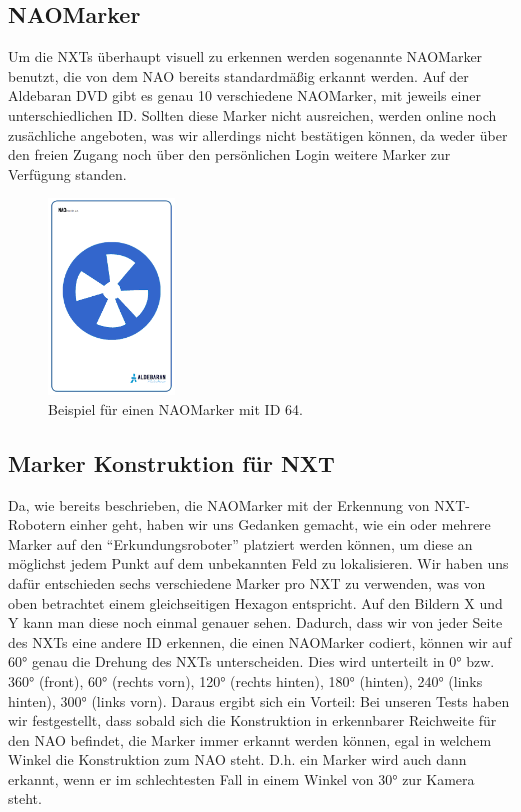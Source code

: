 \subsection{NAOMarker}
Um die NXTs überhaupt visuell zu erkennen werden sogenannte NAOMarker benutzt, die von dem NAO bereits standardmäßig erkannt werden. Auf der Aldebaran DVD gibt es genau 10 verschiedene NAOMarker, mit jeweils einer unterschiedlichen ID. Sollten diese Marker nicht ausreichen, werden online noch zusächliche angeboten, was wir allerdings nicht bestätigen können, da weder über den freien Zugang noch über den persönlichen Login weitere Marker zur Verfügung standen.

\begin{figure}[ht]
    \centering
  \includegraphics[width=0.3\textwidth, angle=0]{img/nao_7.png}
    \caption{Beispiel für einen NAOMarker mit ID 64.}
    \label{nao_marker}
\end{figure}

\subsection{Marker Konstruktion für NXT}
Da, wie bereits beschrieben, die NAOMarker mit der Erkennung von NXT-Robotern einher geht, haben wir uns Gedanken gemacht, wie ein oder mehrere Marker auf den “Erkundungsroboter” platziert werden können, um diese an möglichst jedem Punkt auf dem unbekannten Feld zu lokalisieren. Wir haben uns dafür entschieden sechs verschiedene Marker pro NXT zu verwenden, was von oben betrachtet einem gleichseitigen Hexagon entspricht. Auf den Bildern X und Y kann man diese noch einmal genauer sehen. Dadurch, dass wir von jeder Seite des NXTs eine andere ID erkennen, die einen NAOMarker codiert, können wir auf 60° genau die Drehung des NXTs unterscheiden. Dies wird unterteilt in 0° bzw. 360° (front), 60° (rechts vorn), 120° (rechts hinten), 180° (hinten), 240° (links hinten), 300° (links vorn). Daraus ergibt sich ein Vorteil: Bei unseren Tests haben wir festgestellt, dass sobald sich die Konstruktion in erkennbarer Reichweite für den NAO befindet, die Marker immer erkannt werden können, egal in welchem Winkel die Konstruktion zum NAO steht. D.h. ein Marker wird auch dann erkannt, wenn er im schlechtesten Fall in einem Winkel von 30° zur Kamera steht.

